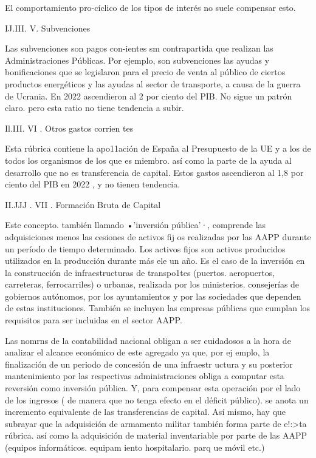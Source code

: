 \documentclass[10pt,a4paper]{article}
\begin{document}
El comportamiento pro-cíclico de los tipos de interés no suele compensar esto.

IJ.III. V. Subvenciones

Las subvenciones son pagos con-ientes sm contrapartida que realizan las Administraciones Públicas. Por ejemplo, son subvenciones las ayudas y bonificaciones que se legislaron para el precio de venta al público de ciertos productos energéticos y las ayudas al sector de transporte, a causa de la guerra de Ucrania. En 2022 ascendieron al 2 por ciento del PIB. No sigue un patrón claro. pero esta ratio no tiene tendencia a subir.

Il.III. VI . Otros gastos corrien tes

Esta rúbrica contiene la apo11ación de España al Presupuesto de la UE y a los de todos los organismos de los que es miembro. así como la parte de la ayuda al desarrollo que no es transferencia de capital. Estos gastos ascendieron al 1,8 por ciento del PIB en 2022 , y no tienen tendencia.

II.JJJ . VII . Formación Bruta de Capital

Este concepto. también llamado •'inversión pública'·, comprende las adquisiciones menos las cesiones de activos fij os realizadas por las AAPP durante un período de tiempo determinado. Los activos fijos son activos producidos utilizados en la producción durante más ele un año. Es el caso de la inversión en la construcción de infraestructuras de transpo1tes (puertos. aeropuertos, carreteras, ferrocarriles) o urbanas, realizada por los ministerios. consejerías de gobiernos autónomos, por los ayuntamientos y por las sociedades que dependen de estas instituciones. También se incluyen las empresas públicas que cumplan los requisitos para ser incluidas en el sector AAPP.

Las nomrns de la contabilidad nacional obligan a ser cuidadosos a la hora de analizar el alcance económico de este agregado ya que, por ej emplo, la finalización de un periodo de concesión de una infraestr uctura y su posterior mantenimiento por las respectivas administraciones obliga a computar esta reversión como inversión pública. Y, para compensar esta operación por el lado de los ingresos ( de manera que no tenga efecto en el déficit público). se anota un incremento equivalente de las transferencias de capital. Así mismo, hay que subrayar que la adquisición de armamento militar también forma parte de e!:>ta rúbrica. así como la adquisición de material inventariable por parte de las AAPP (equipos informáticos. equipam iento hospitalario. parq ue móvil etc.)
\end{document}
